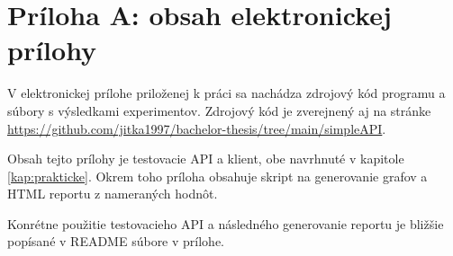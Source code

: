\chapter*{Príloha A: obsah elektronickej prílohy}

V elektronickej prílohe priloženej k práci sa nachádza zdrojový kód
programu a súbory s výsledkami experimentov. Zdrojový kód je
zverejnený aj na stránke \url{https://github.com/jitka1997/bachelor-thesis/tree/main/simpleAPI}.

Obsah tejto prílohy je testovacie API a klient, obe navrhnuté v kapitole \ref{kap:prakticke}. Okrem toho príloha obsahuje skript na generovanie grafov a HTML reportu z nameraných hodnôt.

Konrétne použitie testovacieho API a následného generovanie reportu je bližšie popísané v README súbore v prílohe.
